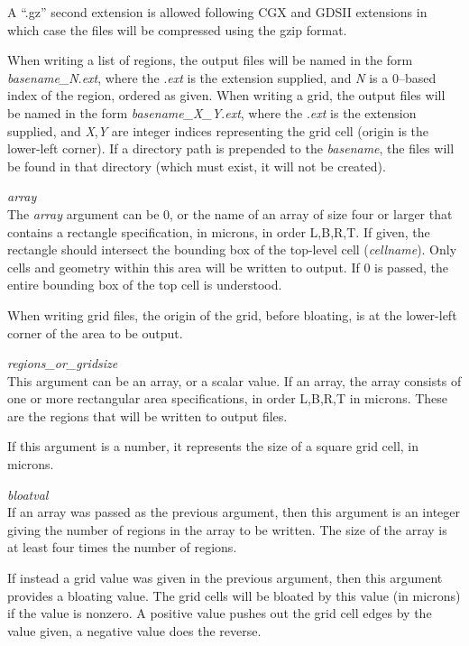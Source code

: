 \begin{description}
\begin{description}
A ``{\vt .gz}'' second extension is allowed following CGX and GDSII
extensions in which case the files will be compressed using the {\vt
gzip} format.

When writing a list of regions, the output files will be named in the
form {\it basename\_N\/}.{\it ext}, where the .{\it ext} is the
extension supplied, and {\it N} is a 0--based index of the region,
ordered as given.  When writing a grid, the output files will be named
in the form {\it basename\_X\_Y\/}.{\it ext\/}, where the .{\it ext}
is the extension supplied, and {\it X\/},{\it Y} are integer indices
representing the grid cell (origin is the lower-left corner).  If a
directory path is prepended to the {\it basename\/}, the files will be
found in that directory (which must exist, it will not be created).

\item{\it array}\\
The {\it array} argument can be 0, or the name of an array of size
four or larger that contains a rectangle specification, in microns, in
order L,B,R,T.  If given, the rectangle should intersect the bounding
box of the top-level cell ({\it cellname\/}).  Only cells and geometry
within this area will be written to output.  If 0 is passed, the
entire bounding box of the top cell is understood.

When writing grid files, the origin of the grid, before bloating, is
at the lower-left corner of the area to be output.

\item{\it regions\_or\_gridsize}\\
This argument can be an array, or a scalar value.  If an array, the
array consists of one or more rectangular area specifications, in
order L,B,R,T in microns.  These are the regions that will be written
to output files.

If this argument is a number, it represents the size of a square grid
cell, in microns.

\item{\it bloatval}\\
If an array was passed as the previous argument, then this argument is
an integer giving the number of regions in the array to be written. 
The size of the array is at least four times the number of regions.

If instead a grid value was given in the previous argument, then
this argument provides a bloating value.  The grid cells will be
bloated by this value (in microns) if the value is nonzero.  A
positive value pushes out the grid cell edges by the value given, a
negative value does the reverse.


\end{description}
\end{description}

